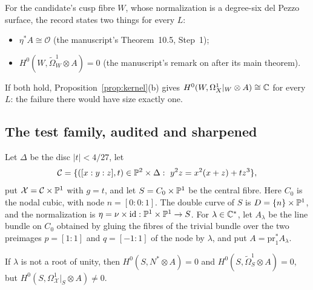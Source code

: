 For the candidate's cusp fibre $W$, whose normalization is a degree-six del Pezzo surface, the record states two things for every $L$:
\begin{itemize}
\item $\eta^*A\cong\mathcal O$ (the manuscript's Theorem~10.5, Step~1);
\item $H^0(W,\widetilde\Omega^1_W\otimes A)=0$ (the manuscript's remark on \cite{CDP20} after its main theorem).
\end{itemize}
If both hold, Proposition~\ref{prop:kernel}(b) gives $H^0(W,\Omega^1_X|_W\otimes A)\cong\mathbb{C}$ for every $L$: the failure there would have size exactly one.


\subsection{The test family, audited and sharpened}

Let $\Delta$ be the disc $|t|<4/27$, let
\[
\mathcal C=\{([x:y:z],t)\in\mathbb{P}^2\times\Delta:\ y^2z=x^2(x+z)+tz^3\},
\]
put $\mathcal X=\mathcal C\times\mathbb{P}^1$ with $g=t$, and let $S=C_0\times\mathbb{P}^1$ be the central fibre. Here $C_0$ is the nodal cubic, with node $n=[0:0:1]$. The double curve of $S$ is $D=\{n\}\times\mathbb{P}^1$, and the normalization is $\eta=\nu\times\mathrm{id}:\mathbb{P}^1\times\mathbb{P}^1\to S$. For $\lambda\in\mathbb{C}^*$, let $A_\lambda$ be the line bundle on $C_0$ obtained by gluing the fibres of the trivial bundle over the two preimages $p=[1:1]$ and $q=[-1:1]$ of the node by $\lambda$, and put $A=\mathrm{pr}_1^*A_\lambda$.

\begin{theorem}\label{thm:testfamily}
If $\lambda$ is not a root of unity, then $H^0(S,N^*\otimes A)=0$ and $H^0(S,\widetilde\Omega^1_S\otimes A)=0$, but $H^0(S,\Omega^1_{\mathcal X}|_S\otimes A)\neq0$.
\end{theorem}

